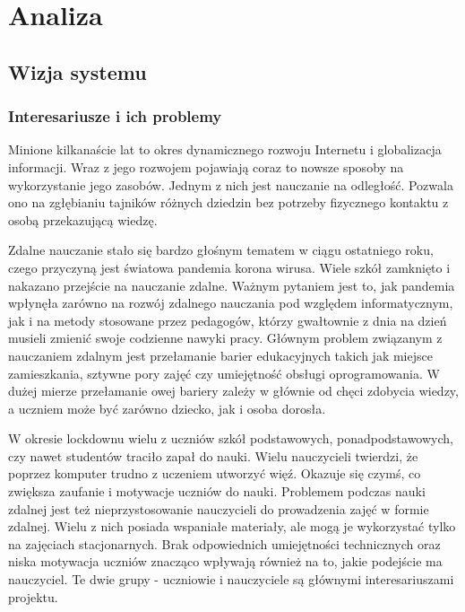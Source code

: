 \chapter{Analiza}

\section{Wizja systemu}

\subsection{Interesariusze i ich problemy}

Minione kilkanaście lat to okres dynamicznego rozwoju Internetu i globalizacja
informacji. Wraz z jego rozwojem pojawiają coraz to nowsze sposoby na
wykorzystanie jego zasobów. Jednym z nich jest nauczanie na odległość.
Pozwala ono na zgłębianiu tajników różnych dziedzin bez potrzeby fizycznego
kontaktu z osobą przekazującą wiedzę.

Zdalne nauczanie stało się bardzo głośnym tematem w ciągu ostatniego roku,
czego przyczyną jest światowa pandemia korona wirusa. Wiele szkół zamknięto i
nakazano przejście na nauczanie zdalne. Ważnym pytaniem jest to, jak pandemia 
wpłynęła zarówno na rozwój zdalnego nauczania pod względem informatycznym, jak 
i na metody stosowane przez pedagogów, którzy gwałtownie z dnia na dzień musieli 
zmienić swoje codzienne nawyki pracy. Głównym problem związanym z nauczaniem 
zdalnym jest przełamanie barier edukacyjnych takich jak miejsce zamieszkania, 
sztywne pory zajęć czy umiejętność obsługi oprogramowania. W dużej mierze 
przełamanie owej bariery zależy w głównie od chęci zdobycia wiedzy, a uczniem 
może być zarówno dziecko, jak i osoba dorosła.

W okresie lockdownu wielu z uczniów szkół podstawowych, ponadpodstawowych, czy 
nawet studentów traciło zapał do nauki. Wielu nauczycieli twierdzi, że poprzez 
komputer trudno z uczeniem utworzyć więź. Okazuje się czymś, co zwiększa zaufanie 
i motywacje uczniów do nauki. Problemem podczas nauki zdalnej jest też 
nieprzystosowanie nauczycieli do prowadzenia  zajęć w formie zdalnej. Wielu z 
nich posiada wspaniałe materiały, ale mogą je wykorzystać tylko na zajęciach 
stacjonarnych. Brak odpowiednich umiejętności  technicznych oraz niska motywacja 
uczniów znacząco wpływają również na to, jakie podejście ma nauczyciel. Te dwie
grupy - uczniowie i nauczyciele są głównymi interesariuszami projektu.

